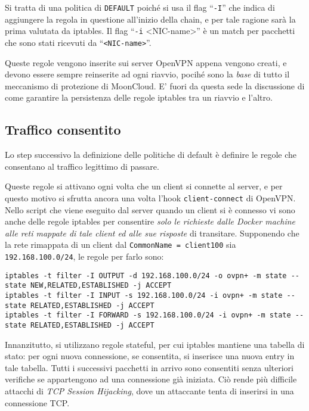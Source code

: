 		Si tratta di una politica di \texttt{DEFAULT} poiché si usa il flag ``\texttt{-I}''
		che indica di aggiungere la regola in questione all'inizio della chain, e per tale
		ragione sarà la prima valutata da iptables. Il flag ``\texttt{-i} <NIC-name>'' è un match
		per pacchetti che sono stati ricevuti da ``\texttt{<NIC-name>}''.
		
		
		Queste regole vengono inserite sui server OpenVPN appena vengono creati, e
		devono essere sempre reinserite ad ogni riavvio, pocihé sono la \textit{base}
		di tutto il meccanismo di protezione di MoonCloud. E' fuori da questa sede la discussione
		di come garantire la persistenza delle regole iptables tra un riavvio e l'altro.
		
		
		\subsection{Traffico consentito}
		Lo step successivo la definizione delle politiche di default è definire le regole che
		consentano al traffico legittimo di passare.
		
		Queste regole si attivano ogni volta che un client si connette al server, e per
		questo motivo si sfrutta ancora una volta l'hook \texttt{client-connect} di OpenVPN.
		Nello script che viene eseguito dal server quando un client si è connesso vi sono
		anche delle regole iptables per consentire \textit{solo le richieste
		dalle Docker machine alle reti mappate di tale client ed alle sue risposte}
		di transitare.
		Supponendo che la rete rimappata di un client dal \texttt{CommonName = client100} sia
		\texttt{192.168.100.0/24}, le regole per farlo sono:
\begin{verbatim}
iptables -t filter -I OUTPUT -d 192.168.100.0/24 -o ovpn+ -m state --state NEW,RELATED,ESTABLISHED -j ACCEPT
iptables -t filter -I INPUT -s 192.168.100.0/24 -i ovpn+ -m state --state RELATED,ESTABLISHED -j ACCEPT
iptables -t filter -I FORWARD -s 192.168.100.0/24 -i ovpn+ -m state --state RELATED,ESTABLISHED -j ACCEPT
\end{verbatim}
		
		Innanzitutto, si utilizzano regole stateful, per cui iptables mantiene
		una tabella di stato: per ogni nuova connessione, se consentita, si inserisce
		una nuova entry in tale tabella. Tutti i successivi pacchetti in arrivo sono consentiti
		senza ulteriori verifiche
		se appartengono ad una connessione già iniziata.
 		Ciò rende più difficile
		attacchi di \textit{TCP Session Hijacking}, dove un attaccante tenta di inserirsi in
		una connessione TCP.
		
